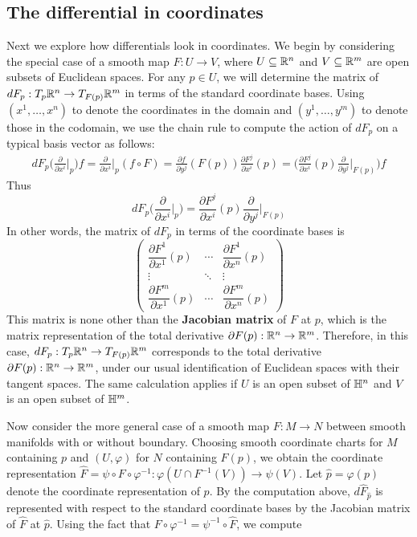 \subsection{The differential in coordinates}
Next we explore how differentials look in coordinates. We begin by considering the special case of a smooth map $F:U\to V$, where $U\subseteq\mathbb{R}^n$ and $V\subseteq\mathbb{R}^m$ are open subsets of Euclidean spaces. For any $p\in U$, we will determine the matrix of $dF_p:T_p\mathbb{R}^n\to T_{F(p)}\mathbb{R}^m$ in terms of the standard coordinate bases. Using $(x^1,\dots,x^n)$ to denote the coordinates in the domain and $(y^1,\dots,y^m)$ to denote those in the codomain, we use the chain rule to compute the action of $dF_p$ on a typical basis vector as follows:
\begin{align*}
dF_p\Big(\frac{\partial}{\partial x^i}\Big|_p\Big)f=\frac{\partial}{\partial x^i}\Big|_p(f\circ F)=\frac{\partial f}{\partial y^j}(F(p))\frac{\partial F^j}{\partial x^i}(p)=\Big(\frac{\partial F^j}{\partial x^i}(p)\frac{\partial}{\partial y^j}\Big|_{F(p)}\Big)f
\end{align*}
Thus
\[dF_p\Big(\frac{\partial}{\partial x^i}\Big|_p\Big)=\frac{\partial F^j}{\partial x^i}(p)\frac{\partial}{\partial y^j}\Big|_{F(p)}\]
In other words, the matrix of $dF_p$ in terms of the coordinate bases is
\[\begin{pmatrix}
\dfrac{\partial F^1}{\partial x^1}(p)&\cdots&\dfrac{\partial F^1}{\partial x^n}(p)\\
\vdots&\ddots&\vdots\\
\dfrac{\partial F^m}{\partial x^1}(p)&\cdots&\dfrac{\partial F^m}{\partial x^n}(p)
\end{pmatrix}\]
This matrix is none other than the \textbf{Jacobian matrix} of $F$ at $p$, which is the matrix representation of the total derivative $\partial F(p):\mathbb{R}^n\to\mathbb{R}^m$. Therefore, in this case, $dF_p:T_p\mathbb{R}^n\to T_{F(p)}\mathbb{R}^m$ corresponds to the total derivative $\partial F(p):\mathbb{R}^n\to\mathbb{R}^m$, under our usual identification of Euclidean spaces with their tangent spaces. The same calculation applies if $U$ is an open subset of $\mathbb{H}^n$ and $V$ is an open subset of $\mathbb{H}^m$.\par
Now consider the more general case of a smooth map $F:M\to N$ between
smooth manifolds with or without boundary. Choosing smooth coordinate charts for $M$ containing $p$ and $(U,\varphi)$ for $N$ containing $F(p)$, we obtain the coordinate representation $\widehat{F}=\psi\circ F\circ\varphi^{-1}:\varphi(U\cap F^{-1}(V))\to \psi(V)$. Let $\widehat{p}=\varphi(p)$ denote the coordinate representation of $p$. By the computation above, $d\widehat{F}_{\widehat{p}}$ is represented with respect to the standard coordinate bases by the Jacobian matrix of $\widehat{F}$ at $\widehat{p}$. Using the fact that $F\circ\varphi^{-1}=\psi^{-1}\circ\widehat{F}$, we compute
